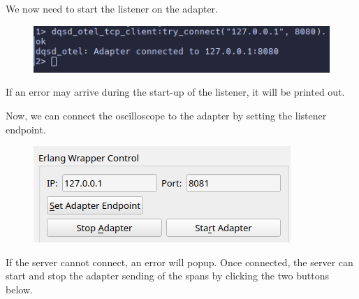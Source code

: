     We now need to start the listener on the adapter.

     \begin{figure}[H]
        \begin{center}
        \includegraphics[width = 0.8 \textwidth]{img/manual/connectadapter.png}
        \end{center}
    \end{figure}

    If an error may arrive during the start-up of the listener, it will be printed out.

    Now, we can connect the oscilloscope to the adapter by setting the listener endpoint.
    
     \begin{figure}[H]
        \begin{center}
        \includegraphics[width = 0.8 \textwidth]{img/manual/endpoint.png}
        \end{center}
    \end{figure}

    If the server cannot connect, an error will popup. Once connected, the server can start and stop the adapter sending of the spans by clicking the two buttons below.
